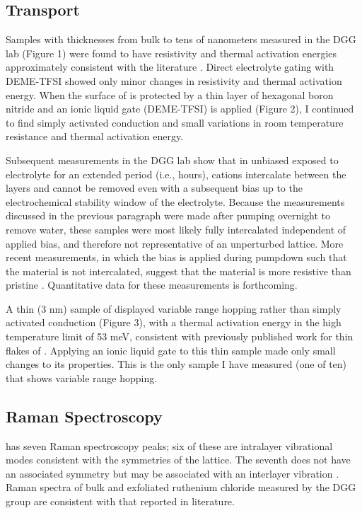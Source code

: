 \documentclass[11pt]{article}
\begin{document}
\subsection{Transport}

Samples with thicknesses from bulk to tens of nanometers measured in the DGG lab (Figure 1) were found to have resistivity and thermal activation energies approximately consistent with the literature \cite{Rojas1983}. Direct electrolyte gating with DEME-TFSI showed only minor changes in resistivity and thermal activation energy. When the surface of \rucl is protected by a thin layer of hexagonal boron nitride and an ionic liquid gate (DEME-TFSI) is applied (Figure 2), I continued to find simply activated conduction and small variations in room temperature resistance and thermal activation energy.

Subsequent measurements in the DGG lab show that in unbiased \rucl exposed to electrolyte for an extended period (i.e., hours), cations intercalate between the layers and cannot be removed even with a subsequent bias up to the electrochemical stability window of the electrolyte. Because the measurements discussed in the previous paragraph were made after pumping overnight to remove water, these samples were most likely fully intercalated independent of applied bias, and therefore not representative of an unperturbed lattice. More recent measurements, in which the bias is applied during pumpdown such that the material is not intercalated, suggest that the material is more resistive than pristine \ruclnospace. Quantitative data for these measurements is forthcoming.

A thin (3 nm) sample of \rucl displayed variable range hopping rather than simply activated conduction (Figure 3), with a thermal activation energy in the high temperature limit of 53 meV, consistent with previously published work for thin flakes of \rucl \cite{Mashhadi2018}. Applying an ionic liquid gate to this thin sample made only small changes to its properties. This is the only sample I have measured (one of ten) that shows variable range hopping.

\subsection{Raman Spectroscopy}

\rucl has seven Raman spectroscopy peaks; six of these are intralayer vibrational modes consistent with the symmetries of the \rucl lattice. The seventh does not have an associated symmetry but may be associated with an interlayer vibration \cite{Zhou2018}. Raman spectra of bulk and exfoliated ruthenium chloride measured by the DGG group are consistent with that reported in literature.
\end{document}
